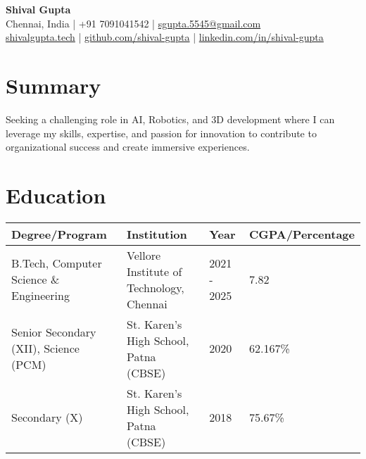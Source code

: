 \documentclass[a4paper,10pt]{article}
\newcommand{\sectionbreak}{\vspace{0.2em}} %
\begin{document}
\begin{center}
    \centering
    {\fontsize{24pt}{28pt}\selectfont \textbf{Shival Gupta}} \\
    \vspace{0.2cm}
    \small Chennai, India | +91 7091041542 | \href{mailto:sgupta.5545@gmail.com}{\textcolor{accentcolor}{sgupta.5545@gmail.com}} \\
    \href{https://shivalgupta.tech/}{\textcolor{accentcolor}{shivalgupta.tech}} | \href{https://github.com/shival-gupta/}{\textcolor{accentcolor}{github.com/shival-gupta}} | \href{https://linkedin.com/in/shival-gupta/}{\textcolor{accentcolor}{linkedin.com/in/shival-gupta}}
\end{center}

\vspace{-0.3cm}

\noindent \hrulefill


\section{Summary}
Seeking a challenging role in AI, Robotics, and 3D development where I can leverage my skills, expertise, and passion for innovation to contribute to organizational success and create immersive experiences.

\sectionbreak

\section{Education}

\begin{tabular}{|l|l|l|l|}
\hline
\textbf{Degree/Program} & \textbf{Institution} & \textbf{Year} & \textbf{CGPA/Percentage} \\ \hline
B.Tech, Computer Science \& Engineering & Vellore Institute of Technology, Chennai & 2021 - 2025 & 7.82 \\ \hline
Senior Secondary (XII), Science (PCM) & St. Karen's High School, Patna (CBSE) & 2020 & 62.167\% \\ \hline
Secondary (X) & St. Karen's High School, Patna (CBSE) & 2018 & 75.67\% \\ \hline
\end{tabular}

\sectionbreak

\end{document}
